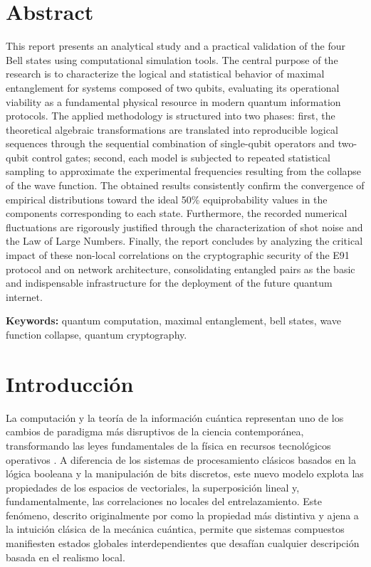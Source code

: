 \documentclass[11pt,a4paper,spanish]{book}
\begin{document}
\chapter{Abstract}
This report presents an analytical study and a practical validation of the four Bell states using computational simulation tools. The central purpose of the research is to characterize the logical and statistical behavior of maximal entanglement for systems composed of two qubits, evaluating its operational viability as a fundamental physical resource in modern quantum information protocols. The applied methodology is structured into two phases: first, the theoretical algebraic transformations are translated into reproducible logical sequences through the sequential combination of single-qubit operators and two-qubit control gates; second, each model is subjected to repeated statistical sampling to approximate the experimental frequencies resulting from the collapse of the wave function. The obtained results consistently confirm the convergence of empirical distributions toward the ideal 50\% equiprobability values in the components corresponding to each state. Furthermore, the recorded numerical fluctuations are rigorously justified through the characterization of shot noise and the Law of Large Numbers. Finally, the report concludes by analyzing the critical impact of these non-local correlations on the cryptographic security of the E91 protocol and on network architecture, consolidating entangled pairs as the basic and indispensable infrastructure for the deployment of the future quantum internet.

\vspace{0.5cm}
{\bf Keywords:} quantum computation, maximal entanglement, bell states, wave function collapse, quantum cryptography.
\mainmatter

\chapter{Introducción}

La computación y la teoría de la información cuántica representan uno de los cambios de paradigma más disruptivos de la ciencia contemporánea, transformando las leyes fundamentales de la física en recursos tecnológicos operativos \citep{nielsen2010}. A diferencia de los sistemas de procesamiento clásicos basados en la lógica booleana y la manipulación de bits discretos, este nuevo modelo explota las propiedades de los espacios de \cite{hilbert1906} vectoriales, la superposición lineal y, fundamentalmente, las correlaciones no locales del entrelazamiento. Este fenómeno, descrito originalmente por \cite{schrodinger1935} como la propiedad más distintiva y ajena a la intuición clásica de la mecánica cuántica, permite que sistemas compuestos manifiesten estados globales interdependientes que desafían cualquier descripción basada en el realismo local.
\end{document}
